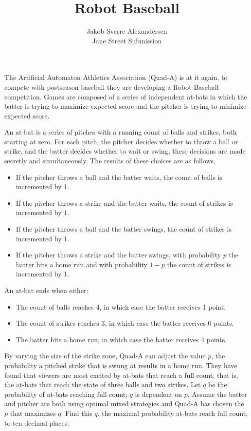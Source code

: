 \documentclass[10pt]{article}
\begin{document}
 
\title{Robot Baseball}
\author{Jakob Sverre Alexandersen\\
Jane Street Submission}
\maketitle

The Artificial Automaton Athletics Association (Quad-A) is at it again, to compete with postseason baseball they are developing a Robot Baseball competition. Games are composed of a series of independent at-bats in which the batter is trying to maximize expected score and the pitcher is trying to minimize expected score.

An at-bat is a series of pitches with a running count of balls and strikes, both starting at zero. For each pitch, the pitcher decides whether to throw a ball or strike, and the batter decides whether to wait or swing; these decisions are made secretly and simultaneously. The results of these choices are as follows.

\begin{itemize}
    \item If the pitcher throws a ball and the batter waits, the count of balls is incremented by 1.
    \item If the pitcher throws a strike and the batter waits, the count of strikes is incremented by 1.
    \item If the pitcher throws a ball and the batter swings, the count of strikes is incremented by 1.
    \item If the pitcher throws a strike and the batter swings, with probability $p$ the batter hits a home run and with probability $1-p$ the count of strikes is incremented by 1.
\end{itemize}

An at-bat ends when either:

\begin{itemize}
    \item The count of balls reaches 4, in which case the batter receives 1 point.
    \item The count of strikes reaches 3, in which case the batter receives 0 points.
    \item The batter hits a home run, in which case the batter receives 4 points.
\end{itemize}

By varying the size of the strike zone, Quad-A can adjust the value $p$, the probability a pitched strike that is swung at results in a home run. They have found that viewers are most excited by at-bats that reach a full count, that is, the at-bats that reach the state of three balls and two strikes. Let $q$ be the probability of at-bats reaching full count; $q$ is dependent on $p$. Assume the batter and pitcher are both using optimal mixed strategies and Quad-A has chosen the $p$ that maximizes $q$. Find this $q$, the maximal probability at-bats reach full count, to ten decimal places.
\end{document}
